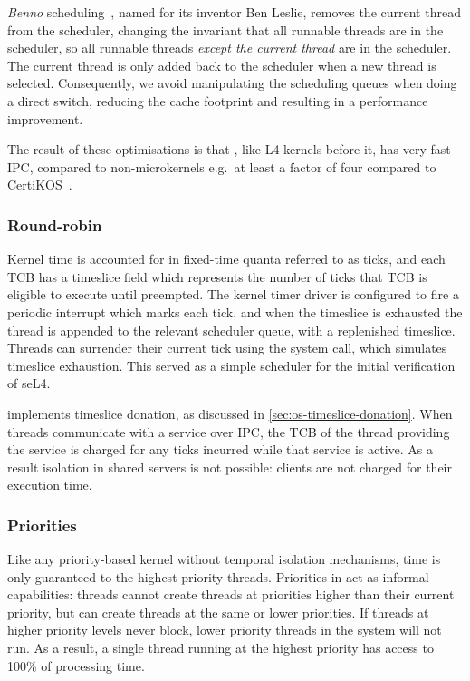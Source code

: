 \emph{Benno} scheduling~\citep{Blackham_SH_12}, named for its inventor Ben Leslie, removes the current thread from the 
scheduler, changing the invariant that all runnable threads are in the scheduler, so all runnable
threads \emph{except the current thread} are in the scheduler. The current thread is only added back
to the scheduler when a new thread is selected. Consequently, we avoid manipulating the
scheduling queues when doing a direct switch, reducing the cache footprint and resulting in a performance improvement.

The result of these optimisations is that \selfour, like L4 kernels before it, has very fast
\gls{IPC}, compared to non-microkernels e.g.\ at least a factor of four compared to CertiKOS~\citep{Gu_SCWKSC_16}.

\subsubsection{Round-robin}
\label{sec:seL4-round-robin}

Kernel time is accounted for in fixed-time quanta referred to as ticks, and each TCB has a timeslice
field which represents the number of ticks that TCB is eligible to execute until preempted. The kernel timer driver is configured to fire a periodic interrupt which marks each tick,
and when the timeslice is exhausted the thread is appended to the relevant scheduler queue,
with a replenished timeslice.
Threads can surrender their current tick using the \yield system call, which simulates
timeslice exhaustion. This
served as a simple scheduler for the initial verification of seL4.


\selfour implements timeslice donation, as discussed in \cref{sec:os-timeslice-donation}. 
When threads communicate with a service over \gls{IPC}, the TCB of the thread providing the service
is charged for any ticks incurred while that service is active. As a result isolation in shared
servers is not possible: clients are not charged for their execution time.

\subsubsection{Priorities}

Like any priority-based kernel without temporal isolation mechanisms, time is only guaranteed to the highest priority threads.
Priorities in \selfour act as informal capabilities: threads cannot create threads at priorities higher than their current priority, but can create threads at the same or lower priorities.
If threads at higher priority levels never block, lower priority threads in the system will not run.
As a result, a single thread running at the highest priority has access to 100\% of processing time.

